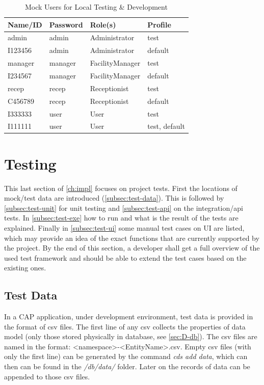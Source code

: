 \begin{table}[H]
    \centering
    \begin{tabular}{|m{2.5cm}|m{2.5cm}|m{3.5cm}|m{2.5cm}|} \hline 
        \textbf{Name/ID} & \textbf{Password} & \textbf{Role(s)} & \textbf{Profile} \\ \hline 
        admin & admin & Administrator & test \\ \hline 
        I123456 & admin & Administrator & default \\ \hline
        manager & manager & FacilityManager & test \\ \hline 
        I234567 & manager & FacilityManager & default \\ \hline 
        recep & recep & Receptionist & test \\ \hline 
        C456789 & recep & Receptionist & default \\ \hline 
        I333333 & user & User & test \\ \hline
        I111111 & user & User & test, default \\ \hline 
    \end{tabular}
    \caption{Mock Users for Local Testing \& Development}
\end{table}

\section{Testing}
\label{sec:D-testing}

This last section of \autoref{ch:impl} focuses on project tests. First the locations of mock/test data are introduced (\autoref{subsec:test-data}). This is followed by \autoref{subsec:test-unit} for unit testing and \autoref{subsec:test-api} on the integration/api tests. In \autoref{subsec:test-exe} how to run and what is the result of the tests are explained. Finally in \autoref{subsec:test-ui} some manual test cases on UI are listed, which may provide an idea of the exact functions that are currently supported by the project. By the end of this section, a developer shall get a full overview of the used test framework and should be able to extend the test cases based on the existing ones.

\subsection{Test Data}
\label{subsec:test-data}
In a CAP application, under development environment, test data is provided in the format of csv \cite{csv} files. The first line of any csv collects the properties of data model (only those stored physically in database, see \autoref{sec:D-db}). The csv files are named in the format: <namespace>-<EntityName>.csv. Empty csv files (with only the first line) can be generated by the command \textit{cds add data}, which can then can be found in the \textit{/db/data/} folder. Later on the records of data can be appended to those csv files.

